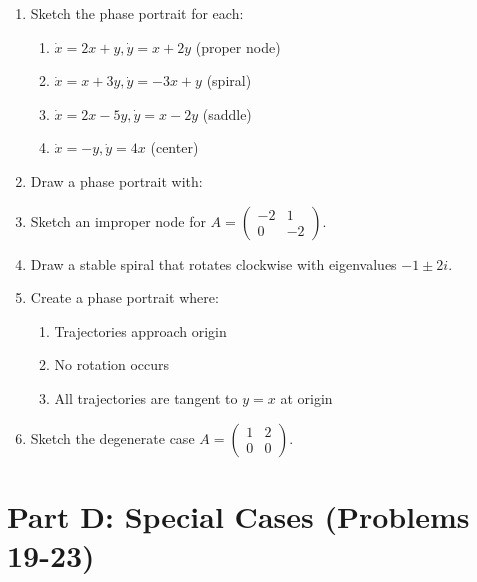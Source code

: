 \documentclass[12pt]{article}
\begin{document}
\begin{enumerate}[resume]
\item Sketch the phase portrait for each:
\begin{enumerate}[label=(\alph*)]
    \item $\dot{x} = 2x + y, \dot{y} = x + 2y$ (proper node)
    \item $\dot{x} = x + 3y, \dot{y} = -3x + y$ (spiral)
    \item $\dot{x} = 2x - 5y, \dot{y} = x - 2y$ (saddle)
    \item $\dot{x} = -y, \dot{y} = 4x$ (center)
\end{enumerate}

\item Draw a phase portrait with:

\item Sketch an improper node for $A = \begin{pmatrix} -2 & 1 \\ 0 & -2 \end{pmatrix}$.

\item Draw a stable spiral that rotates clockwise with eigenvalues $-1 \pm 2i$.

\item Create a phase portrait where:
\begin{enumerate}[label=(\alph*)]
    \item Trajectories approach origin
    \item No rotation occurs
    \item All trajectories are tangent to $y = x$ at origin
\end{enumerate}

\item Sketch the degenerate case $A = \begin{pmatrix} 1 & 2 \\ 0 & 0 \end{pmatrix}$.
\end{enumerate}

\section*{Part D: Special Cases (Problems 19-23)}
\end{document}
